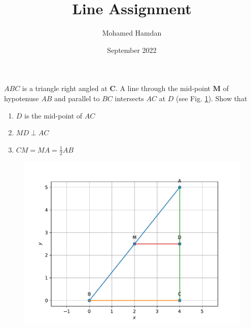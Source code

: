 \documentclass[journal,10pt,twocolumn]{article}
\title{\textbf{Line Assignment}}
\author{Mohamed Hamdan}
\date{September 2022}
\let\vec\mathbf
\begin{document}
\maketitle
\fi
 $ABC$ is a triangle right angled at $\vec{C}$. A line through the mid-point $\vec{M}$ of hypotenuse $AB$ and parallel to $BC$ intersects $AC$ at $D$ (see Fig.  
		\ref{fig:9/8/2/7}).
Show that
\begin{enumerate}
	\item $D$ is the mid-point of $AC$
	\item $MD \perp AC$
	\item $CM = MA = \frac{1}{2}AB$
\end{enumerate}
	\begin{figure}[!h]
		\centering
 \includegraphics[width=\columnwidth]{chapters/9/8/2/7/figs/fig1.pdf}
		\caption{}
		\label{fig:9/8/2/7}
  	\end{figure}
	\solution 
\end{document}
